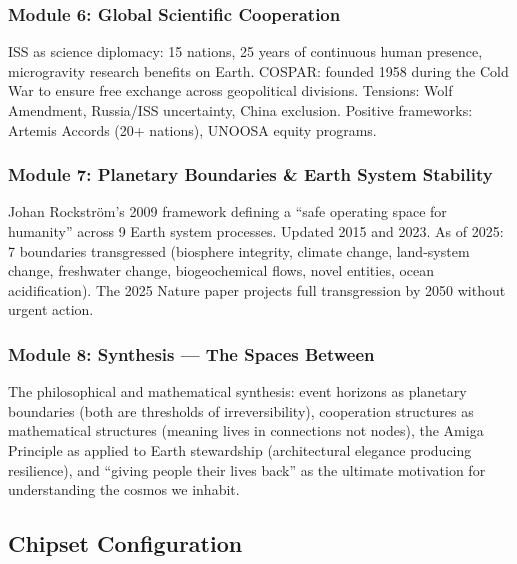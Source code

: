 \documentclass[11pt,letterpaper]{article}
\begin{document}
\subsubsection{Module 6: Global Scientific Cooperation}
ISS as science diplomacy: 15 nations, 25 years of continuous human presence, microgravity research benefits on Earth. COSPAR: founded 1958 during the Cold War to ensure free exchange across geopolitical divisions. Tensions: Wolf Amendment, Russia/ISS uncertainty, China exclusion. Positive frameworks: Artemis Accords (20+ nations), UNOOSA equity programs.

\subsubsection{Module 7: Planetary Boundaries \& Earth System Stability}
Johan Rockstr{\"o}m's 2009 framework defining a ``safe operating space for humanity'' across 9 Earth system processes. Updated 2015 and 2023. As of 2025: 7 boundaries transgressed (biosphere integrity, climate change, land-system change, freshwater change, biogeochemical flows, novel entities, ocean acidification). The 2025 Nature paper projects full transgression by 2050 without urgent action.

\subsubsection{Module 8: Synthesis --- The Spaces Between}
The philosophical and mathematical synthesis: event horizons as planetary boundaries (both are thresholds of irreversibility), cooperation structures as mathematical structures (meaning lives in connections not nodes), the Amiga Principle as applied to Earth stewardship (architectural elegance producing resilience), and ``giving people their lives back'' as the ultimate motivation for understanding the cosmos we inhabit.

\subsection{Chipset Configuration}
\end{document}
